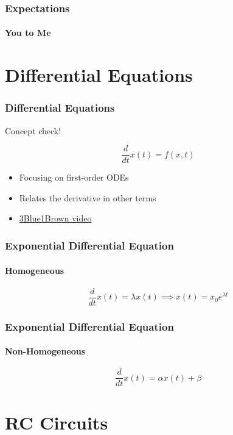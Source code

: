 \documentclass[aspectratio=169]{beamer}
\newcommand{\diff}[1]{\frac{d}{d #1}}
\begin{document}
\begin{frame}
    \frametitle{Expectations}
    \framesubtitle{You to Me}

\end{frame}

\section{Differential Equations}

\begin{frame}
    \frametitle{Differential Equations}

    Concept check! \pause

    \begin{equation}
        \diff{t} x(t) = f(x, t)
    \end{equation}
    \begin{itemize}
        \item Focusing on first-order ODEs
        \item Relates the derivative in other terms
        \item \href{https://youtu.be/p_di4Zn4wz4?list=PLZHQObOWTQDNPOjrT6KVlfJuKtYTftqH6}{3Blue1Brown video}
    \end{itemize}
\end{frame}

\begin{frame}
    \frametitle{Exponential Differential Equation}
    \framesubtitle{Homogeneous}

    \begin{equation}
        \diff{t} x(t) = \lambda x(t) \implies x(t) = x_0 e^{\lambda t}
    \end{equation}
\end{frame}

\begin{frame}
    \frametitle{Exponential Differential Equation}
    \framesubtitle{Non-Homogeneous}

    \begin{equation}
        \diff{t} x(t) = \alpha x(t) + \beta
    \end{equation}
\end{frame}

\section{RC Circuits}
\end{document}
